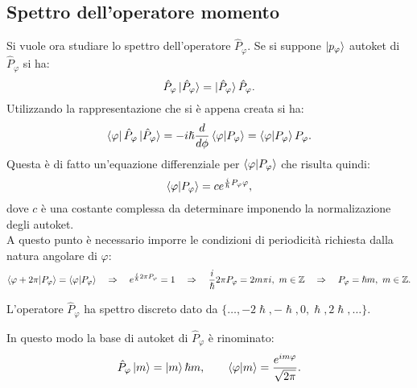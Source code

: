 \subsection{Spettro dell'operatore momento}
Si vuole ora studiare lo spettro dell'operatore $\hat P_\varphi$. Se si suppone $\ket{p_\varphi}$ autoket di $\hat P_\varphi$ si ha:
\begin{equation*}
    \hat P_\varphi\ket{\hat P_\varphi}=\ket{\hat P_\varphi}\hat P_\varphi.
\end{equation*}
Utilizzando la rappresentazione che si è appena creata si ha:
\begin{equation*}
    \bra{\varphi}\hat P_\varphi\ket{\hat P_\varphi}=-i\hslash\frac{d}{d\phi}\braket{\varphi|P_\varphi}=\braket{\varphi|P_\varphi}P_\varphi.
\end{equation*}
Questa è di fatto un'equazione differenziale per $\braket{\varphi|P_\varphi}$ che risulta quindi:
\begin{equation*}
    \braket{\varphi|P_\varphi}=ce^{\frac{i}{\hslash}P_\varphi\varphi},
\end{equation*}
dove $c$ è una costante complessa da determinare imponendo la normalizazione degli autoket.\\
A questo punto è necessario imporre le condizioni di periodicità richiesta dalla natura angolare di $\varphi$:
\begin{equation*}
    \braket{\varphi+2\pi|P_\varphi}=\braket{\varphi|P_\varphi}\quad\Rightarrow\quad e^{\frac{i}{\hslash}2\pi P_\varphi}=1\quad\Rightarrow\quad\frac{i}{\hslash}2\pi P_\varphi=2m\pi i,\ m\in\mathbb{Z}\quad\Rightarrow\quad P_\varphi=\hslash m,\ m\in\mathbb{Z}.
\end{equation*}
\begin{proposition}
    L'operatore $\hat P_\varphi$ ha spettro discreto dato da $\{\dots,-2\hslash,-\hslash,0,\hslash,2\hslash,\dots\}$.
\end{proposition}
In questo modo la base di autoket di $\hat P_\varphi$ è rinominato:
\begin{equation*}
    \hat P_\varphi\ket{m}=\ket{m}\hslash m,\qquad\braket{\varphi|m}=\frac{e^{im\varphi}}{\sqrt{2\pi}}.
\end{equation*}